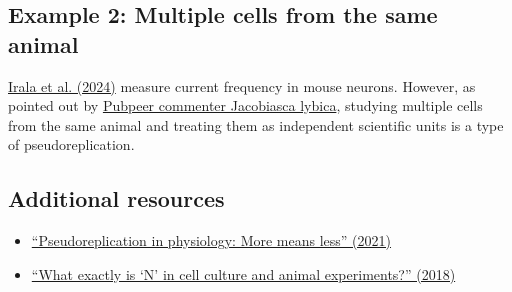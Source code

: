 \documentclass[letterpaper, 12pt]{article}
\begin{document}
\subsection*{Example 2: Multiple cells from the same animal}

\href{https://doi.org/10.1016/j.neuron.2024.03.007}{Irala et al. (2024)} measure current frequency in mouse neurons.
However, as pointed out by \href{https://pubpeer.com/publications/889076BC68B15221992DC17B4C4639}{Pubpeer commenter Jacobiasca lybica}, studying multiple cells from the same animal and treating them as independent scientific units is a type of pseudoreplication.


\subsection*{Additional resources}
\begin{itemize}
    \setlength\itemsep{-0.5em}
    \item \href{https://doi.org/10.1085/jgp.202012826}{``Pseudoreplication in physiology: More means less'' (2021)}
        \item \href{https://doi.org/10.1371/journal.pbio.2005282}{``What exactly is ‘N’ in cell culture and animal experiments?'' (2018)}

\end{itemize}
\end{document}
